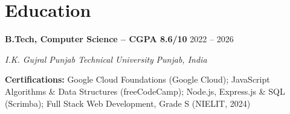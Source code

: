 \documentclass[letterpaper,10.5pt]{article}
\newcommand{\Entry}[4]{%
  \textbf{#1} \hfill {\small #2}\par
  \textit{\small #3} \hfill {\small\textit{#4}}\par\vspace{-1pt}}
\newcommand{\SkillRow}[2]{{\small \textbf{#1:} #2}\par\vspace{1.5pt}}
\begin{document}
\section{Education}
\Entry{B.Tech, Computer Science -- CGPA 8.6/10}{2022 -- 2026}{I.K. Gujral Punjab Technical University}{Punjab, India}
\vspace{2pt}
\SkillRow{Certifications}{Google Cloud Foundations (Google Cloud); JavaScript Algorithms \& Data Structures (freeCodeCamp); Node.js, Express.js \& SQL (Scrimba); Full Stack Web Development, Grade S (NIELIT, 2024)}
\end{document}
